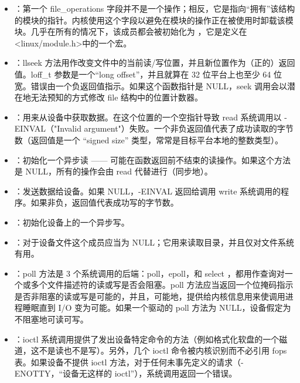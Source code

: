 \documentclass[lang=cn,newtx,10pt,scheme=chinese]{elegantbook}
\begin{document}
\begin{itemize}
    \item {}：第一个 file\_operations 字段并不是一个操作；相反，它是指向``拥有''该结构的模块的指针。内核使用这个字段以避免在模块的操作正在被使用时卸载该模块。几乎在所有的情况下，该成员都会被初始化为  ，它是定义在<linux/module.h>中的一个宏。
    \item {}：llseek 方法用作改变文件中的当前读/写位置，并且新位置作为（正的）返回值。loff\_t 参数是一个``long offset''，并且就算在 32 位平台上也至少 64 位宽。错误由一个负返回值指示。如果这个函数指针是 NULL，seek 调用会以潜在地无法预知的方式修改 file 结构中的位置计数器。
    \item {}：用来从设备中获取数据。在这个位置的一个空指针导致 read 系统调用以 -EINVAL（"Invalid argument"）失败。一个非负返回值代表了成功读取的字节数（返回值是一个 ``signed size'' 类型，常常是目标平台本地的整数类型）。
    \item {}：初始化一个异步读 —— 可能在函数返回前不结束的读操作。如果这个方法是 NULL，所有的操作会由 read 代替进行（同步地）。
    \item {}：发送数据给设备。如果 NULL，-EINVAL 返回给调用 write 系统调用的程序。如果非负，返回值代表成功写的字节数。
    \item {}：初始化设备上的一个异步写。
    \item {}：对于设备文件这个成员应当为 NULL；它用来读取目录，并且仅对文件系统有用。
    \item {}：poll 方法是 3 个系统调用的后端：poll，epoll，和 select ，都用作查询对一个或多个文件描述符的读或写是否会阻塞。poll 方法应当返回一个位掩码指示是否非阻塞的读或写是可能的，并且，可能地，提供给内核信息用来使调用进程睡眠直到 I/O 变为可能。如果一个驱动的 poll 方法为 NULL，设备假定为不阻塞地可读可写。
    \item {}：ioctl 系统调用提供了发出设备特定命令的方法（例如格式化软盘的一个磁道，这不是读也不是写）。另外，几个 ioctl 命令被内核识别而不必引用 fops 表。如果设备不提供 ioctl 方法，对于任何未事先定义的请求（-ENOTTY，``设备无这样的 ioctl''），系统调用返回一个错误。

\end{itemize}
\end{document}

